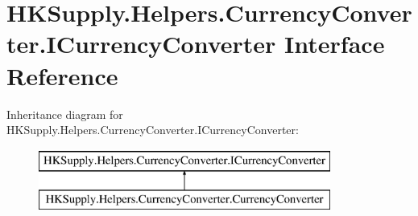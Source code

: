 \hypertarget{interface_h_k_supply_1_1_helpers_1_1_currency_converter_1_1_i_currency_converter}{}\section{H\+K\+Supply.\+Helpers.\+Currency\+Converter.\+I\+Currency\+Converter Interface Reference}
\label{interface_h_k_supply_1_1_helpers_1_1_currency_converter_1_1_i_currency_converter}
Inheritance diagram for H\+K\+Supply.\+Helpers.\+Currency\+Converter.\+I\+Currency\+Converter\+:\begin{figure}[H]
\begin{center}
\leavevmode
\includegraphics[height=2.000000cm]{interface_h_k_supply_1_1_helpers_1_1_currency_converter_1_1_i_currency_converter}
\end{center}
\end{figure}
